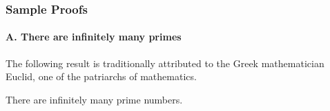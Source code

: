 \subsubsection{Sample Proofs}
\label{sec:sample-contradictions}

\paragraph{\small\sf A. There are infinitely many primes}

The following result is traditionally attributed to the Greek
mathematician Euclid,
one of the patriarchs of mathematics.

\begin{prop}
\label{thm:Primes-infinite}
There are infinitely many prime numbers.
\end{prop}


